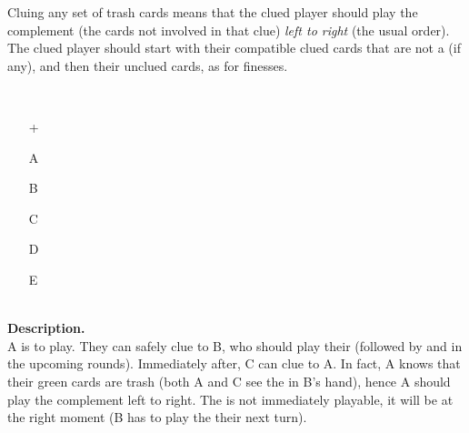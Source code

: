 \begin{convention}
	Cluing any set of trash cards means that the clued player should play the complement (the cards not involved in that clue) \emph{left to right} (the usual order). The clued player should start with their compatible clued cards that are not a  (if any), and then their unclued cards, as for finesses.
\end{convention}

\begin{example}	\hfill \\
	\begin{minipage}{0.45\textwidth}
		\begin{itemize}
			\item[\Large +]      
			\item[\Large A]    
			\item[\Large B]    
			\item[\Large C]    
			\item[\Large D]    
			\item[\Large E]    
		\end{itemize}
	\end{minipage}%
	\begin{minipage}{0.55\textwidth}
		\hfill \\
		
		\textbf{Description.} \\
		
		A is to play. They can safely clue  to B, who should play their  (followed by  and  in the upcoming rounds). Immediately after, C can clue  to A. In fact, A knows that their green cards are trash (both A and C see the  in B's hand), hence A should play the complement left to right. The  is not immediately playable, it will be at the right moment (B has to play the  their next turn).
	\end{minipage}
\end{example} \vspace{0.15 cm}


